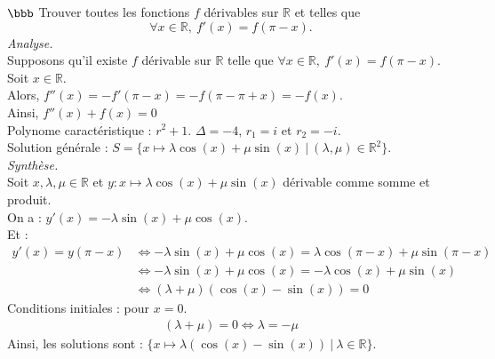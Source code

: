 \documentclass[11pt]{article}
\begin{document}
\begin{exercice}{$\bbb$}{}
    Trouver toutes les fonctions $f$ dérivables sur $\mathbb{R}$ et telles que
    \begin{equation*}
        \forall x \in \mathbb{R}, ~ f'(x) = f(\pi - x).
    \end{equation*}
    \tcblower
    \emph{Analyse.}\\
    Supposons qu'il existe $f$ dérivable sur $\mathbb{R}$ telle que $\forall x \in \mathbb{R}, ~ f'(x) = f(\pi-x)$.\\
    Soit $x\in\mathbb{R}$.\\
    Alors, $f''(x) = -f'(\pi-x) = -f(\pi - \pi + x) = -f(x)$.\\
    Ainsi, $f''(x) + f(x) = 0$\\
    Polynome caractéristique : $r^2 + 1$. $\Delta = -4$, $r_1=i$ et $r_2=-i$.\\
    Solution générale : $S = \{x\mapsto \lambda \cos(x) + \mu \sin(x) ~ | ~ (\lambda, \mu) \in \mathbb{R}^2\}$.\\
    \emph{Synthèse.}\\
    Soit $x,\lambda,\mu\in\mathbb{R}$ et $y:x\mapsto\lambda\cos(x) + \mu\sin(x)$ dérivable comme somme et produit.\\
    On a : $y'(x) = -\lambda\sin(x) + \mu\cos(x)$.\\
    Et : 
    \begin{align*}
        y'(x) = y(\pi - x) &\iff -\lambda\sin(x) + \mu\cos(x) = \lambda\cos(\pi - x) + \mu\sin(\pi - x)\\
        &\iff -\lambda\sin(x) + \mu\cos(x) = -\lambda\cos(x) + \mu\sin(x)\\
        &\iff (\lambda + \mu)(\cos(x) - \sin(x)) = 0
    \end{align*}
    Conditions initiales : pour $x=0$.
    \begin{align*}
        (\lambda + \mu) = 0 \iff \lambda = -\mu
    \end{align*}
    Ainsi, les solutions sont : $\{x\mapsto \lambda(\cos(x) - \sin(x)) ~ | ~ \lambda \in \mathbb{R}\}$.
\end{exercice}
\end{document}
